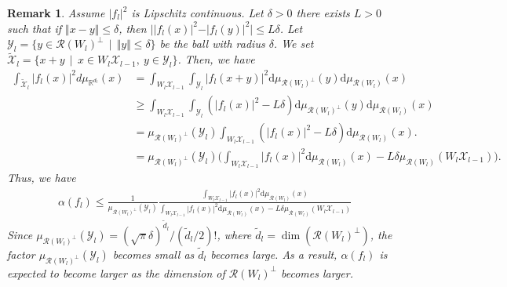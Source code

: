 \documentclass[twoside]{article}
\newtheorem{remark}[proposition]{Remark}
\def\mcl#1{\mathcal{#1}}
\def\opn{\operatorname}
\def\mr{\mathrm}
\begin{document}
\begin{remark}

Assume $\vert f_l\vert^2$ is Lipschitz continuous.
Let $\delta>0$ there exists $L>0$ such that if $\Vert x-y\Vert \le \delta$, then $\vert \vert f_l(x)\vert^2-\vert f_l(y)\vert^2\vert\le L\delta$.
Let $\mcl{Y}_l= \{y\in\mcl{R}(W_l)^{\perp}\,\mid\, \Vert y\Vert \le \delta\}$ be the ball with radius $\delta$. 
We set $\tilde{\mcl{X}}_l=\{x+y\,\mid\,x\in W_l\mcl{X}_{l-1},\ y\in \mcl{Y}_l \}$.
Then, we have
\begin{align*}
\int_{\tilde{\mcl{X}}_l} |f_l(x)|^2 d\mu_{\mathbb{R}^{d_l}}(x)
&=\int_{W_l\mcl{X}_{l-1}}\int_{\mcl{Y}_l} |f_l(x+y)|^2 \mr{d}\mu_{\mcl{R}(W_l)^{\perp}}(y)\mr{d}\mu_{\mcl{R}(W_l)}(x) \\
&\ge \int_{W_l\mcl{X}_{l-1}}\int_{\mcl{Y}_l} (|f_l(x)|^2-L\delta) \mr{d}\mu_{\mcl{R}(W_l)^{\perp}}(y)\mr{d}\mu_{\mcl{R}(W_l)}(x)\\
&= \mu_{\mcl{R}(W_l)^{\perp}}(\mcl{Y}_l)\int_{W_l\mcl{X}_{l-1}}(|f_l(x)|^2-L\delta) \mr{d}\mu_{\mcl{R}(W_l)}(x).\\
&=\mu_{\mcl{R}(W_l)^{\perp}}(\mcl{Y}_l)\bigg(\int_{W_l\mcl{X}_{l-1}}|f_l(x)|^2 \mr{d}\mu_{\mcl{R}(W_l)}(x)-L\delta\mu_{\mcl{R}(W_l)}(W_l\mcl{X}_{l-1})\bigg). 
\end{align*}
Thus, we have
\begin{align*}
\alpha(f_l)\le \frac{1}{\mu_{\mcl{R}(W_l)^{\perp}}(\mcl{Y}_l)}\frac{\int_{W_l\mcl{X}_{l-1}}|f_l(x)|^2 \mr{d}\mu_{\mcl{R}(W_l)}(x)}{\int_{W_l\mcl{X}_{l-1}}|f_l(x)|^2 \mr{d}\mu_{\mcl{R}(W_l)}(x)-L\delta\mu_{\mcl{R}(W_l)}(W_l\mcl{X}_{l-1})}
\end{align*}
Since $\mu_{\mcl{R}(W_l)^{\perp}}(\mcl{Y}_l)=(\sqrt{\pi}\delta)^{\tilde{d}_l}/(\tilde{d}_l/2)!$, where $\tilde{d}_l=\opn{dim}(\mcl{R}(W_l)^{\perp})$, the factor $\mu_{\mcl{R}(W_l)^{\perp}}(\mcl{Y}_l)$ becomes small as $\tilde{d}_l$ becomes large.
As a result, $\alpha(f_l)$ is expected to become larger as the dimension of $\mcl{R}(W_l)^{\perp}$ becomes larger.
\end{remark}
\end{document}
